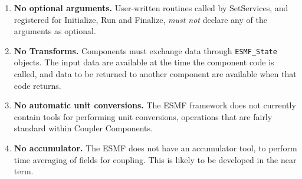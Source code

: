 %


\begin{enumerate}

\item {\bf No optional arguments.} User-written routines called by SetServices,
and registered for Initialize, Run and Finalize, {\em must not} declare any
of the arguments as optional.

\item {\bf No Transforms.}  Components must exchange data through 
{\tt ESMF\_State} objects.  The input data are available at the time 
the component code is called, and data to be returned to another 
component are available when that code returns.  

\item {\bf No automatic unit conversions.}  The ESMF framework does not 
currently contain tools for performing unit conversions, operations that 
are fairly standard within Coupler Components.

\item {\bf No accumulator.}  The ESMF does not have an accumulator tool, to
perform time averaging of fields for coupling.  This is likely to be developed
in the near term.

\end{enumerate}
